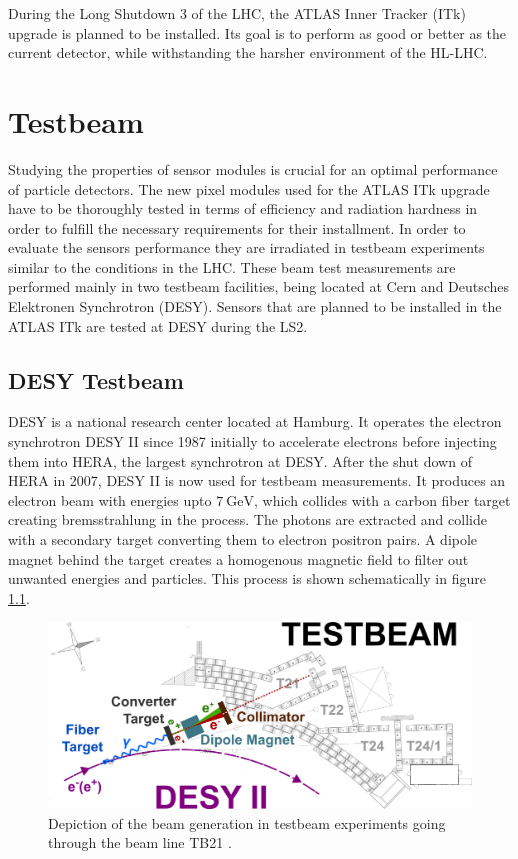 During the Long Shutdown 3 of the LHC, the ATLAS Inner Tracker (ITk) upgrade is planned to be installed. Its goal is to perform as good or better as the current detector, while
withstanding the harsher environment of the HL-LHC.

\chapter{Testbeam}
Studying the properties of sensor modules is crucial for an optimal performance of particle detectors. The new pixel modules used for the ATLAS ITk upgrade have to be thoroughly
tested in terms of efficiency and radiation hardness in order to fulfill the necessary requirements for their installment.
In order to evaluate the sensors performance they are irradiated in testbeam experiments similar to the conditions in the LHC.
These beam test measurements are performed mainly in two testbeam facilities, being located at Cern and Deutsches Elektronen Synchrotron (DESY). Sensors that are planned to be
installed in the ATLAS ITk are tested at DESY during the LS2.

\section{DESY Testbeam}
DESY is a national research center located at Hamburg. It operates the electron synchrotron DESY II since 1987 initially to accelerate electrons before injecting them into
HERA, the largest synchrotron at DESY. After the shut down of HERA in 2007, DESY II is now used for testbeam measurements. It produces an electron beam with energies upto
$\SI{7}{\GeV}$, which collides with a carbon fiber target creating bremsstrahlung in the process. The photons are extracted and collide with a secondary target
converting them to electron positron pairs. A dipole magnet behind the target creates a homogenous magnetic field to filter out unwanted energies and particles. This process
is shown schematically in figure \ref{fig:testbeam}.

\begin{figure}
  \centering
  \includegraphics[height=0.4\textwidth]{images/desy.png}
  \caption{Depiction of the beam generation in testbeam experiments going through the beam line TB21 \cite{testbeam}.}
  \label{fig:testbeam}
\end{figure}

